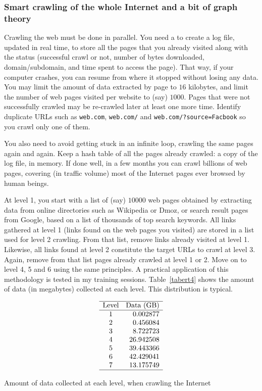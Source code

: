 \documentclass[oneside,10pt]{book}
\renewcommand{\arraystretch}{1.4} %
\begin{document}
\subsubsection{Smart crawling of the whole Internet and a bit of graph theory}

Crawling the web must be done in parallel. You need a to create a log file, updated in real time, to store all the pages that you already visited along with the status (successful crawl or not, number of bytes downloaded, domain/subdomain, and time spent to access the page). That way, if your computer crashes, you can resume from where it stopped without losing any data. You may limit the amount of data extracted by page to $16$ kilobytes, and limit the number of web pages visited per website to (say) $\num{1000}$. Pages that were not successfully crawled may be re-crawled later at least one more time. Identify duplicate URLs such as
 \texttt{web.com}, \texttt{web.com/} and \texttt{web.com/?source=Facbook} so you crawl only one of them.

You also need to avoid getting stuck in an infinite loop, crawling the same pages again and again. Keep a hash table of all the pages already crawled: a copy of the log file, in memory. If done well, in a few months you can crawl billions of web pages, covering (in traffic volume) most of the Internet pages ever browsed by human beings.

At level 1, you start with a list of (say) $\num{10000}$ web pages obtained by extracting data from online directories such as Wikipedia or Dmoz, or search result pages from Google, based on a list of thousands of top search keywords. All links gathered at level 1 (links found on the web pages you visited) are stored in a list used for level 2 crawling. From that list, remove links already visited at level 1. Likewise, all links found at level 2 constitute the target URLs to crawl at level 3. Again, remove from that list pages already crawled at level 1 or 2. Move on to level 4, 5 and 6 using the same principles.  A practical application of this methodology is tested in my training sessions. Table~\ref{tabert4} shows the amount of data (in megabytes) collected at each level. This distribution is typical.



\renewcommand{\arraystretch}{1.2} %
\begin{table}[H]
\small
\[
\begin{array}{cr}
\hline
 \mbox{Level} &  \text{Data (GB)}  \\
\hline
1 & 0.002877 \\
2 & 0.456084 \\
3 & 8.722723 \\
4 & 26.942508 \\
5 & 39.443366 \\
6 & 42.429041 \\
7 & 13.175749 \\
\hline
\end{array}
\]
\caption{\label{tabert4} Amount of data collected at each level, when crawling the Internet}
\end{table}
\end{document}
